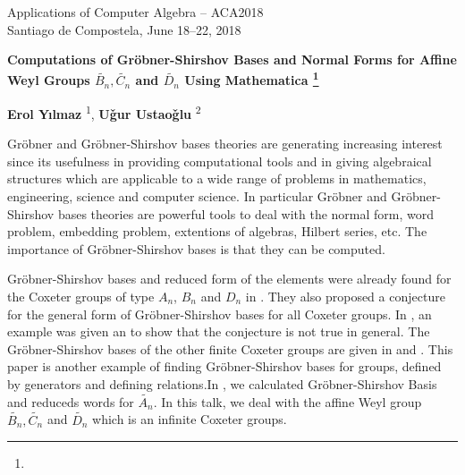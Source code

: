\documentclass{article}
\makeatletter
\newcommand{\TITLE}[2][]{
  \begin{center} \Large \bfseries #2%
  \def\@temp{#1}\ifx\@temp\@empty\relax\else\footnote{#1}\fi\end{center}}
\newcommand{\AUTHOR}[2][]{\textbf{#2}%
  \def\@temp{#1}\ifx\@temp\@empty\relax\else\textsuperscript{#1}\fi}
\newcommand{\HEADING}{
{\noindent \small Applications of Computer Algebra -- ACA2018 \\
Santiago de Compostela, June 18--22, 2018} \vspace{10pt}}
\makeatother
\begin{document}
\HEADING


\TITLE{Computations of Gr\"{o}bner-Shirshov Bases and Normal Forms for Affine Weyl Groups $\widetilde{B_n}, \widetilde{C_n}$ and $\widetilde{D_n}$ Using Mathematica}



\begin{center}
 \AUTHOR[1]{Erol Y{\i}lmaz},
 \AUTHOR[2]{U\v{g}ur Ustao\v{g}lu}
\end{center}





\par Gr\"{o}bner and Gr\"{o}bner-Shirshov bases theories are generating increasing interest since its usefulness in providing computational tools and in giving algebraical structures which are applicable to a wide range of problems in mathematics, engineering, science and computer science. In particular Gr\"{o}bner and Gr\"{o}bner-Shirshov bases theories are powerful tools to deal with the normal form, word problem, embedding problem, extentions of algebras, Hilbert series, etc. The importance of Gr\"{o}bner-Shirshov bases is that they can be computed.\\

\par Gr\"{o}bner-Shirshov bases and reduced form of the elements were already found for the Coxeter groups of type $A_n$, $B_n$ and $D_n$ in \cite{bokut1}. They also proposed a conjecture for the general form of Gr\"{o}bner-Shirshov bases for all Coxeter groups. In \cite{chen} , an example was given an to show that the conjecture is not true in general. The Gr\"{o}bner-Shirshov bases of the other finite Coxeter groups are given in \cite{E1} and \cite{E2}. This paper is another example of finding Gr\"{o}bner-Shirshov bases for groups, defined by generators and defining relations.In \cite{ugur}, we calculated Gr\"{o}bner-Shirshov Basis and reduceds words for $\widetilde{A_n}$. In this talk, we deal with the affine Weyl group $\widetilde{B_n}, \widetilde{C_n}$ and $\widetilde{D_n}$  which is an infinite Coxeter groups.\\
\end{document}
